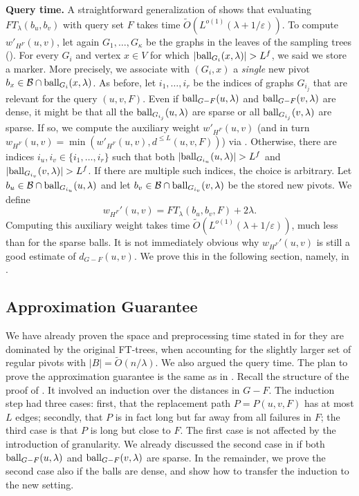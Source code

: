\documentclass{theoretics}
\newcommand*{\Otilde}{\widetilde{O}}
\newcommand*{\ball}{\mbox{\rm ball}}
\renewcommand{\le}{\leqslant}
\begin{document}
\noindent
\textbf{Query time.}
A straightforward generalization of 
shows that evaluating $FT_{\lambda}(b_u,b_v)$ with query set $F$
takes time $\Otilde(L^{o(1)} (\lambda + 1/\varepsilon))$.
To compute $w'_{H^F}(u,v)$,
let again $G_1, \ldots, G_\kappa$ be the graphs in the leaves of the sampling trees ().
For every $G_i$ and vertex $x \in V$ for which $|\ball_{G_i}(x,\lambda)| > L^f$,
we said we store a marker.
More precisely, we associate with $(G_i,x)$
a \emph{single} new pivot $b_x \in \mathcal{B} \cap \ball_{G_i}(x,\lambda)$. 
As before, let $i_1, \dots, i_r$ be the indices of graphs $G_{i_j}$
that are relevant for the query $(u,v,F)$.
Even if $\ball_{G-F}(u,\lambda)$ and $\ball_{G-F}(v,\lambda)$
are dense, it might be that all the $\ball_{G_{i_j}}(u,\lambda)$ are sparse
or all $\ball_{G_{i_j}}(v,\lambda)$ are sparse.
If so, we compute the auxiliary weight $w'_{H^F}(u,v)$
(and in turn $w_{H^F}(u,v) = \min(w'_{H^F}(u,v), d^{\le L}(u,v,F))$) 
via .
%
Otherwise, there are indices $i_u,i_v \in \{i_1, \ldots, i_r\}$ such that both
$|\ball_{G_{i_u}}(u,\lambda)| > L^f$ and $|\ball_{G_{i_v}}(v,\lambda)| > L^f$.
If there are multiple such indices, the choice is arbitrary.
Let $b_u \in \mathcal{B} \cap \ball_{G_{i_u}}(u, \lambda)$ and let $b_v \in \mathcal{B} \cap \ball_{G_{i_v}}(v, \lambda)$ be the stored new pivots.
We define
\begin{equation} 
\label{eq:dense-pivots}
w_{H^F}'(u,v)= FT_\lambda(b_u, b_v, F) + 2\lambda.
\end{equation}
Computing this auxiliary weight takes time $\Otilde(L^{o(1)} (\lambda + 1/\varepsilon))$,
much less than for the sparse balls.
It is not immediately obvious why $w_{H^F}'(u,v)$ is still a good estimate of $d_{G-F}(u,v)$.
We prove this in the following section, namely, in .


\subsection{Approximation Guarantee}
\label{subsec:improved_wrapup}

We have already proven the space and preprocessing time stated in 
for they are dominated by the original FT-trees,
when accounting for the slightly larger set of regular pivots with $|B| = \Otilde(n/\lambda)$.
We also argued the query time.
%
The plan to prove the approximation guarantee is the same as in .
Recall the structure of the proof of .
It involved an induction over the distances in $G{-}F$.
The induction step had three cases:
first, that the replacement path $P =P(u,v,F)$ has at most $L$ edges;
secondly, that $P$ is in fact long but far away from all failures in $F$;
the third case is that $P$ is long but close to $F$.
The first case is not affected by the introduction of granularity.
We already discussed the second case in 
if both $\ball_{G-F}(u,\lambda)$ and $\ball_{G-F}(v,\lambda)$ are sparse.
In the remainder, we prove the second case also if the balls are dense,
and show how to transfer the induction to the new setting.
\end{document}
